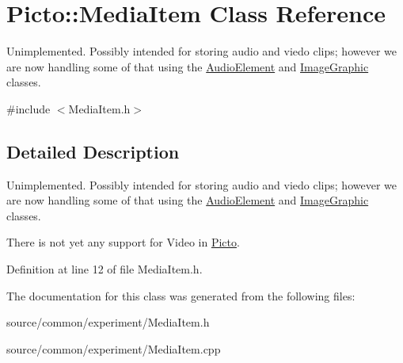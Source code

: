 \hypertarget{class_picto_1_1_media_item}{\section{Picto\-:\-:Media\-Item Class Reference}
\label{class_picto_1_1_media_item}
}


Unimplemented. Possibly intended for storing audio and viedo clips; however we are now handling some of that using the \hyperlink{class_picto_1_1_audio_element}{Audio\-Element} and \hyperlink{class_picto_1_1_image_graphic}{Image\-Graphic} classes.  




{\ttfamily \#include $<$Media\-Item.\-h$>$}



\subsection{Detailed Description}
Unimplemented. Possibly intended for storing audio and viedo clips; however we are now handling some of that using the \hyperlink{class_picto_1_1_audio_element}{Audio\-Element} and \hyperlink{class_picto_1_1_image_graphic}{Image\-Graphic} classes. 

There is not yet any support for Video in \hyperlink{namespace_picto}{Picto}. 

Definition at line 12 of file Media\-Item.\-h.



The documentation for this class was generated from the following files\-:\begin{DoxyCompactItemize}
\item 
source/common/experiment/Media\-Item.\-h\item 
source/common/experiment/Media\-Item.\-cpp\end{DoxyCompactItemize}
